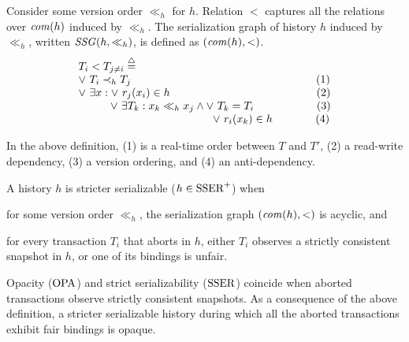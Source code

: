 \begin{definition}
  Consider some version order $\ll_h$ for $h$.
  Relation $<$ captures all the relations over $\committed{h}$ induced by $\ll_h$.
  The serialization graph of history $h$ induced by $\ll_h$, written $\SSG(h,\ll_h)$, is defined as $(\committed{h},<)$.
  \begin{displaymath}
    \begin{array}{l}
      T_i < T_{j \neq i}  \equaldef \\
      \lor~ T_i \hb_h T_j {\hspace{16.8em}\text{(1)}} \\
      \lor~ \exists x : \lor~ r_j(x_i) \in h {\hspace{13.3em}\text{(2)}} \\
      \hspace{2.9em}\lor~ \exists T_k : x_k \ll_h x_j \land \lor~T_k = T_i {\hspace{5.7em}\text{(3)}} \\
      \hspace{12.2em} \lor~ r_i(x_k) \in h {\hspace{3.9em}\text{(4)}}
    \end{array}
  \end{displaymath}  
\end{definition}
In the above definition, (1) is a real-time order between $T$ and $T'$, (2) a read-write dependency, (3) a version ordering, and (4) an anti-dependency.

\begin{definition}
  A history $h$ is stricter serializable ($h \in \SPSER$) when
  \begin{inparaenum}
  \item for some version order $\ll_h$, the serialization graph $(\committed{h},<)$ is acyclic, and
  \item for every transaction $T_i$ that aborts in $h$, either $T_i$ observes a strictly consistent snapshot in $h$, or one of its bindings is unfair.
  \end{inparaenum}
\end{definition}

Opacity ($\OPA$) and strict serializability ($\SSER$) coincide when aborted transactions observe strictly consistent snapshots.
As a consequence of the above definition, a stricter serializable history during which all the aborted transactions exhibit fair bindings is opaque.

